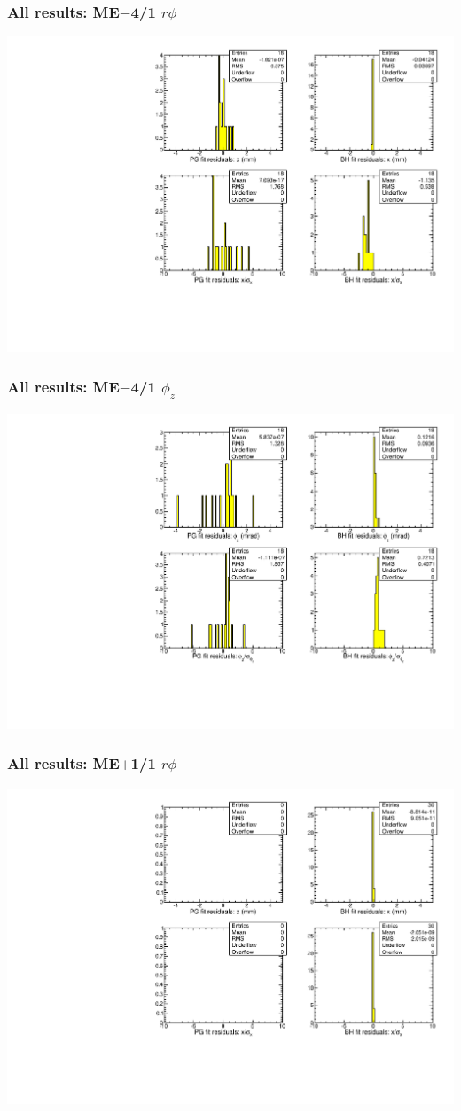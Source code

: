 \documentclass[compress]{beamer}
\begin{document}
\begin{frame}
\frametitle{All results: ME$-$4/1 $r\phi$}
\includegraphics[width=\linewidth]{newplots_fitresiduals_MEm4_1_x.pdf}
\end{frame}
\begin{frame}
\frametitle{All results: ME$-$4/1 $\phi_z$}
\includegraphics[width=\linewidth]{newplots_fitresiduals_MEm4_1_phiz.pdf}
\end{frame}
\begin{frame}
\frametitle{All results: ME$+$1/1 $r\phi$}
\includegraphics[width=\linewidth]{newplots_fitresiduals_MEp1_1_x.pdf}
\end{frame}
\end{document}
